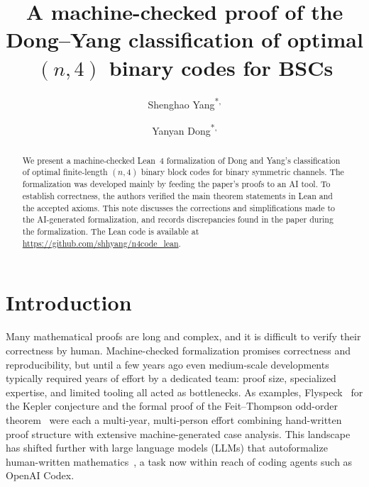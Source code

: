 \documentclass[12pt]{article}
\title{A machine-checked proof of the Dong--Yang classification of
optimal $(n,4)$ binary codes for BSCs}
\author{%
  Shenghao Yang\textsuperscript{*,\dag} \and
  Yanyan Dong\textsuperscript{*,\dag}%
}
\date{}
\begin{document}
\maketitle
\begingroup
\renewcommand{\thefootnote}{\fnsymbol{footnote}}
\endgroup

\begin{abstract}
We present a machine-checked Lean~4 formalization of Dong and Yang's
classification of optimal finite-length $(n,4)$ binary block codes for
binary symmetric channels.
The formalization was developed mainly by feeding the paper's proofs to an AI
tool.
To establish correctness, the authors verified the main theorem statements in
Lean and the accepted axioms.
This note discusses the corrections and simplifications made to the AI-generated formalization, and records discrepancies found in the paper during the formalization.
The Lean code is available at \url{https://github.com/shhyang/n4code_lean}.
\end{abstract}

\tableofcontents
\bigskip

\section{Introduction}
\label{sec:intro}

Many mathematical proofs are long and complex, and it is difficult to verify their correctness by human.
Machine-checked formalization promises correctness and reproducibility,
but until a few years ago even medium-scale developments typically required
years of effort by a dedicated team: proof size, specialized expertise, and
limited tooling all acted as bottlenecks.
As examples, Flyspeck~\cite{flyspeck} for the Kepler conjecture and the
formal proof of the Feit--Thompson odd-order theorem~\cite{FT} were each a
multi-year, multi-person effort combining hand-written proof structure with
extensive machine-generated case analysis. This landscape has shifted further with large language models (LLMs) that autoformalize human-written mathematics~\cite{autoformalize,formalizeassistant}, a task now within reach of coding agents such as OpenAI Codex.
\end{document}
